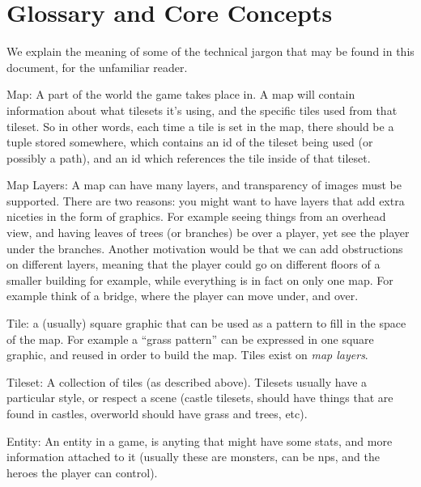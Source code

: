 \section{Glossary and Core Concepts}

We explain the meaning of some of the technical jargon that may be found in this
document, for the unfamiliar reader.

\begin{description}

\item {Map}: A part of the world the game takes place in. A map will contain
  information about what tilesets it's using, and the specific tiles used from
  that tileset. So in other words, each time a tile is set in the map, there
  should be a tuple stored somewhere, which contains an id of the tileset being
  used (or possibly a path), and an id which references the tile inside of that
  tileset.

\item {Map Layers}: A map can have many layers, and transparency of images must
  be supported. There are two reasons: you might want to have layers that add
  extra niceties in the form of graphics. For example seeing things from an
  overhead view, and having leaves of trees (or branches) be over a player, yet
  see the player under the branches. Another motivation would be that we can add
  obstructions on different layers, meaning that the player could go on
  different floors of a smaller building for example, while everything is in
  fact on only one map. For example think of a bridge, where the player can move
  under, and over.

\item {Tile}: a (usually) square graphic that can be used as a pattern to fill
  in the space of the map. For example a ``grass pattern'' can be expressed in
  one square graphic, and reused in order to build the map. Tiles exist on
  \textit{map layers}.

\item {Tileset}: A collection of tiles (as described above). Tilesets usually
  have a particular style, or respect a scene (castle tilesets, should have
  things that are found in castles, overworld should have grass and trees, etc).

\item {Entity}: An entity in a game, is anyting that might have some stats, and
  more information attached to it (usually these are monsters, can be nps, and
  the heroes the player can control).


\end{description}
